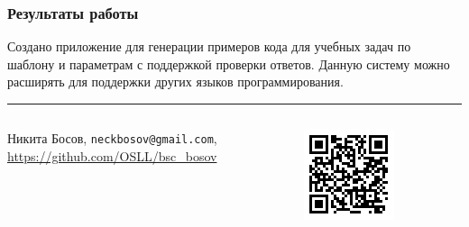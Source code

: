 \documentclass[14pt,aspectratio=169,hyperref={pdftex,unicode},xcolor=dvipsnames]{beamer}
\begin{document}


\begin{frame}
    \frametitle{Результаты работы}
    Создано приложение для генерации примеров кода для учебных задач по шаблону и параметрам
    с поддержкой проверки ответов. Данную систему можно расширять для поддержки других языков программирования.

    \vspace{5mm}\hrule\vspace{5mm}

    \begin{center}
        \begin{columns}
            \begin{column}[]{0.8\textwidth}
                Никита Босов, \texttt{neckbosov@gmail.com},\\ \url{https://github.com/OSLL/bsc_bosov}
            \end{column}
            \begin{column}[]{0.15\textwidth}
                \includegraphics[width=\textwidth]{images/github-qr.png}
            \end{column}
        \end{columns}
    \end{center}


\end{frame}
\end{document}
